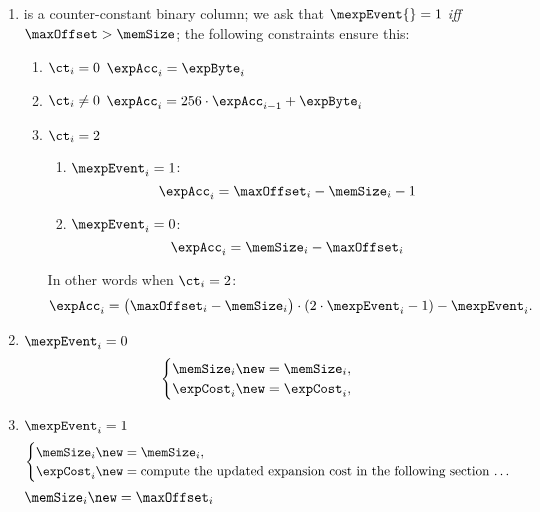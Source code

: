 \begin{enumerate}
	\item \mexpEvent{} is a counter-constant binary column; we ask that $\mexpEvent{} = 1$ \emph{iff} $\maxOffset > \memSize$; the following constraints ensure this:
	\begin{enumerate}
		\item \If $\ct_i = 0$ \Then $\expAcc_i = \expByte_i$
		\item \If $\ct_i \neq 0$ \Then $\expAcc_i = 256 \cdot \expAcc_{i-1} + \expByte_i$
		\item \If $\ct_i = 2$ \Then 
		\begin{enumerate}
			\item \If $\mexpEvent_{i} = 1$:
			\[
				\expAcc_{i} = \maxOffset_{i} - \memSize_{i} - 1
			\]
			\item \If $\mexpEvent_{i} = 0$:
			\[
				\expAcc_{i} = \memSize_{i} - \maxOffset_{i}
			\]
		\end{enumerate}
		In other words when $\ct_i = 2$:
		\[
			\expAcc_{i}
			=
			\big(\maxOffset_{i} - \memSize_{i}\big)\cdot(2\cdot\mexpEvent_i - 1)
			-
			\mexpEvent_i.
		\]
	\end{enumerate}
	\item \If $\mexpEvent_i = 0$ \Then
	\[
		\begin{cases}
			\memSize_{i}\new = \memSize_{i}, \\
			\expCost_{i}\new = \expCost_{i},
		\end{cases}		
	\]
	\item \If $\mexpEvent_i = 1$ \Then
	\[
		\begin{cases}
			\memSize_{i}\new = \memSize_{i}, \\
			\expCost_{i}\new = \text{compute the updated expansion cost in the following section \dots{}}
		\end{cases}		
	\]
	$\memSize_{i}\new = \maxOffset_{i}$
\end{enumerate}
